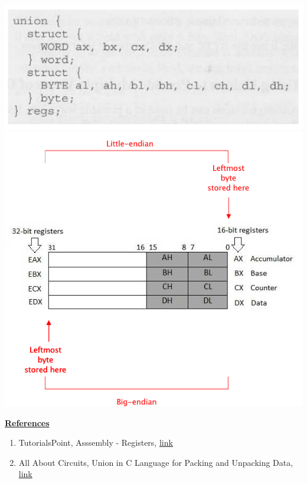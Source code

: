 \documentclass[12pt]{article}
\begin{document}
\begin{enumerate}[1.]
\begin{itemize}
\begin{itemize}
\begin{itemize}
                \begin{center}
                \includegraphics[width=0.8\linewidth]{images/review_9_solution_13.png}
                \includegraphics[width=0.8\linewidth]{images/review_9_solution_14.png}
                \end{center}
            \end{itemize}
        \end{itemize}
    \end{itemize}

    \bigskip

    \underline{\textbf{References}}

    \bigskip

    \begin{enumerate}[1)]
        \item TutorialsPoint, Asssembly - Registers, \href{https://www.tutorialspoint.com/assembly_programming/assembly_registers.htm}{link}
        \item All About Circuits, Union in C Language for Packing and Unpacking Data, \href{https://www.allaboutcircuits.com/technical-articles/union-in-c-language-for-packing-and-unpacking-data/}{link}
    \end{enumerate}

\end{enumerate}
\end{document}

